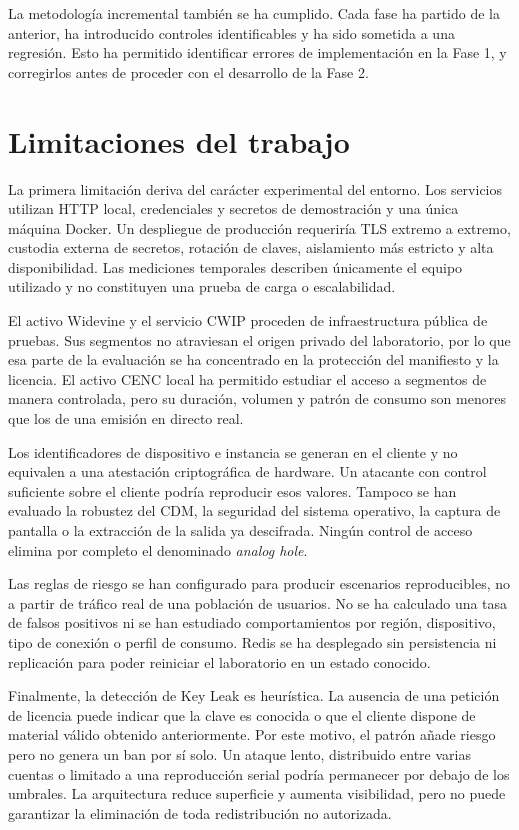 La metodología incremental también se ha cumplido. Cada fase ha partido de la anterior, ha introducido controles identificables y ha sido sometida a una regresión. Esto ha permitido identificar errores de implementación en la Fase 1, y corregirlos antes de proceder con el desarrollo de la Fase 2.

\section{Limitaciones del trabajo}

La primera limitación deriva del carácter experimental del entorno. Los servicios utilizan HTTP local, credenciales y secretos de demostración y una única máquina Docker. Un despliegue de producción requeriría TLS extremo a extremo, custodia externa de secretos, rotación de claves, aislamiento más estricto y alta disponibilidad. Las mediciones temporales describen únicamente el equipo utilizado y no constituyen una prueba de carga o escalabilidad.

El activo Widevine y el servicio CWIP proceden de infraestructura pública de pruebas. Sus segmentos no atraviesan el origen privado del laboratorio, por lo que esa parte de la evaluación se ha concentrado en la protección del manifiesto y la licencia. El activo CENC local ha permitido estudiar el acceso a segmentos de manera controlada, pero su duración, volumen y patrón de consumo son menores que los de una emisión en directo real.

Los identificadores de dispositivo e instancia se generan en el cliente y no equivalen a una atestación criptográfica de hardware. Un atacante con control suficiente sobre el cliente podría reproducir esos valores. Tampoco se han evaluado la robustez del CDM, la seguridad del sistema operativo, la captura de pantalla o la extracción de la salida ya descifrada. Ningún control de acceso elimina por completo el denominado \textit{analog hole}.

Las reglas de riesgo se han configurado para producir escenarios reproducibles, no a partir de tráfico real de una población de usuarios. No se ha calculado una tasa de falsos positivos ni se han estudiado comportamientos por región, dispositivo, tipo de conexión o perfil de consumo. Redis se ha desplegado sin persistencia ni replicación para poder reiniciar el laboratorio en un estado conocido.

Finalmente, la detección de Key Leak es heurística. La ausencia de una petición de licencia puede indicar que la clave es conocida o que el cliente dispone de material válido obtenido anteriormente. Por este motivo, el patrón añade riesgo pero no genera un ban por sí solo. Un ataque lento, distribuido entre varias cuentas o limitado a una reproducción serial podría permanecer por debajo de los umbrales. La arquitectura reduce superficie y aumenta visibilidad, pero no puede garantizar la eliminación de toda redistribución no autorizada.

